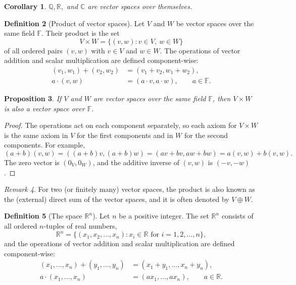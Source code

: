 \documentclass[11pt]{article}
\theoremstyle{definition}
\newtheorem{definition}{Definition}[section]
\theoremstyle{plain}
\newtheorem{proposition}[definition]{Proposition}
\newtheorem{corollary}[definition]{Corollary}
\theoremstyle{remark}
\newtheorem{remark}[definition]{Remark}
\begin{document}
\begin{corollary}\label{cor:fields}
    $\mathbb{Q}, \mathbb{R},$ and $\mathbb{C}$ are vector spaces over themselves.
\end{corollary}

\begin{definition}[Product of vector spaces]
    Let $V$ and $W$ be vector spaces over the same field $\mathbb{F}$. Their product is the set
    \[V \times W = \{(v, w) : v \in V, \ w \in W\}\]
    of all ordered pairs $(v, w)$ with $v \in V$ and $w \in W$. The operations of vector addition and scalar multiplication are defined component-wise:
    \begin{align*}
        (v_1, w_1) + (v_2, w_2) &= (v_1 + v_2, w_1 + w_2), \\
        a \cdot (v, w) &= (a \cdot v, a \cdot w), \qquad a \in \mathbb{F}.
    \end{align*}
\end{definition}

\begin{proposition}\label{prop:product}
    If $V$ and $W$ are vector spaces over the same field $\mathbb{F}$, then $V \times W$ is also a vector space over $\mathbb{F}$.
\end{proposition}

\begin{proof}
    The operations act on each component separately, so each axiom for $V \times W$ is the same axiom in $V$ for the first components and in $W$ for the second components. For example,
    \[(a + b)(v, w) = ((a + b)v, (a + b)w) = (av + bv, aw + bw) = a(v, w) + b(v, w).\]
    The zero vector is $(0_V, 0_W)$, and the additive inverse of $(v, w)$ is $(-v, -w)$.
\end{proof}

\begin{remark}
    For two (or finitely many) vector spaces, the product is also known as the (external) direct sum of the vector spaces, and it is often denoted by $V \oplus W$.
\end{remark}

\begin{definition}[The space $\mathbb{R}^n$]
    Let $n$ be a positive integer. The set $\mathbb{R}^n$ consists of all ordered $n$-tuples of real numbers,
    \[\mathbb{R}^n = \{(x_1, x_2, \ldots, x_n) : x_i \in \mathbb{R} \text{ for } i = 1, 2, \ldots, n\},\]
    and the operations of vector addition and scalar multiplication are defined component-wise:
    \begin{align*}
        (x_1, \ldots, x_n) + (y_1, \ldots, y_n) &= (x_1 + y_1, \ldots, x_n + y_n), \\
        a \cdot (x_1, \ldots, x_n) &= (a x_1, \ldots, a x_n), \qquad a \in \mathbb{R}.
    \end{align*}
\end{definition}
\end{document}
